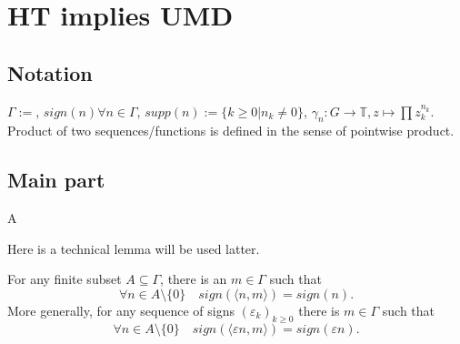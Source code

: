 \section{HT implies UMD }\label{sec-HT to UMD}

\subsection{Notation}
$\Gamma:=$, $sign(n)\forall n\in\Gamma$, $supp(n):=\{k\geq0| n_k\ne0\}$,
$\gamma_n\colon G\to \mathbb{T}, z\mapsto \prod z_k^{n_k}$. Product of two sequences/functions is defined in the sense of pointwise product. 

\subsection{Main part}
\begin{definition}
A
\end{definition}
Here is a technical lemma will be used latter.
\begin{lemma}
    For any finite subset $A\subseteq \Gamma$, there is an $m\in\Gamma$ such that
        \[\forall n \in A\setminus\{0\}\quad sign(\langle n,m\rangle)=sign(n).\]
    More generally, for any sequence of signs $(\varepsilon_k)_{k\geq0}$ there is $m\in\Gamma$ such that
        \[\forall n \in A\setminus\{0\}\quad sign(\langle \varepsilon n,m\rangle)=sign(\varepsilon n).\]
\end{lemma}
